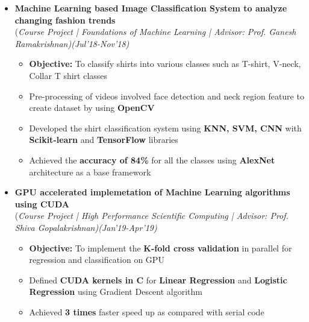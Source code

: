 \documentclass[a4paper,10pt]{article}
\begin{document}
\begin{itemize}
\item \textbf{Machine Learning based Image Classification System to analyze changing fashion trends}\\
(\emph{Course Project | Foundations of Machine Learning | Advisor: Prof. Ganesh Ramakrishnan)\hfill (Jul’18-Nov'18)} \\[-0.4cm]
	\begin{itemize}[noitemsep,nolistsep]
    \item \textbf{Objective:} To classify shirts into various classes such as T-shirt, V-neck, Collar T shirt classes
    \item Pre-processing of videos involved face detection and neck region feature to create dataset by using \textbf{OpenCV}
    \item Developed the shirt classification system using \textbf{KNN, SVM, CNN} with \textbf{Scikit-learn} and \textbf{TensorFlow} libraries
    \item Achieved the \textbf{accuracy of 84\%} for all the classes using \textbf{AlexNet} architecture as a base framework
	\end{itemize}

\newpage

\item \textbf{GPU accelerated implemetation of Machine Learning algorithms using CUDA}\\
(\emph{Course Project | High Performance Scientific Computing | Advisor: Prof. Shiva Gopalakrishnan)\hfill (Jan'19-Apr’19)} \\[-0.4cm]
	\begin{itemize}[noitemsep,nolistsep]
	\item \textbf{Objective:} To implement the \textbf{K-fold cross validation} in parallel for regression and classification on GPU
    \item Defined \textbf{CUDA kernels in C} for \textbf{Linear Regression} and \textbf{Logistic Regression} using Gradient Descent algorithm
    \item Achieved \textbf{3 times} faster speed up as compared with serial code
	\end{itemize}
	

\end{itemize}
\end{document}
